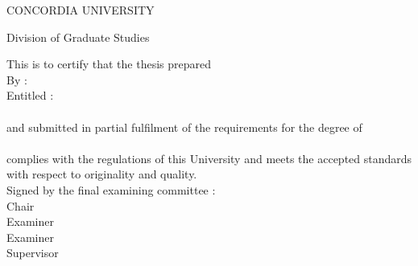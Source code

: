   \begin{titlepage}
     \vspace*{1ex}
     \begin{center}
        CONCORDIA UNIVERSITY
     \end{center}
     \begin{center}
        Division of Graduate Studies
     \end{center}
     \vspace{3ex}
     This is to certify that the thesis prepared\\[2ex]
     By :\hspace{40pt}{\bf Shayan Eskandari}\\[2ex]
     Entitled :\hspace*{13pt}{\bf Privacy and Usability of}\\ 
     \hspace*{62pt}{\bf Bitcoin} \\[2ex]
    and submitted in partial fulfilment of the requirements for the degree
    of\\[2ex]
    \hspace*{62pt}{\bf Master of Computer and Electical Engineering}\\[2ex]
    complies with the regulations of this University and meets the accepted
    standards with respect to originality and quality. \\[2ex]
    Signed by the final examining committee : \\[5ex]
    \hspace*{77pt}\underline{\hspace{234pt}} Chair\\
    \hspace*{77pt}\underline{\hspace{234pt}} Examiner\\
    \hspace*{77pt}\underline{\hspace{234pt}} Examiner\\
    \hspace*{77pt}\underline{\hspace{234pt}} Supervisor \\

\end{titlepage}
